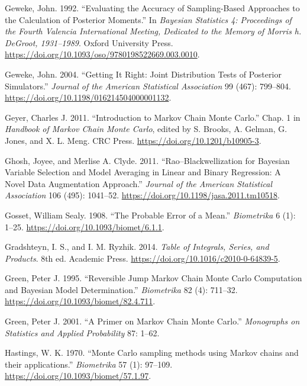 \documentclass[
  11pt,
  letterpaper,
]{scrbook}
\newlength{\cslhangindent}
\newenvironment{CSLReferences}[2] %
 {\begin{list}{}{%
  \setlength{\itemindent}{0pt}
  \setlength{\leftmargin}{0pt}
  \setlength{\parsep}{0pt}
  \ifodd #1
   \setlength{\leftmargin}{\cslhangindent}
   \setlength{\itemindent}{-1\cslhangindent}
  \fi
  \setlength{\itemsep}{#2\baselineskip}}}
 {\end{list}}
\theoremstyle{definition}
\theoremstyle{plain}
\theoremstyle{plain}
\theoremstyle{plain}
\theoremstyle{definition}
\theoremstyle{definition}
\theoremstyle{plain}
\theoremstyle{plain}
\theoremstyle{remark}
\begin{document}
\begin{CSLReferences}{1}{1}
Geweke, John. 1992. {``Evaluating the Accuracy of Sampling-Based
Approaches to the Calculation of Posterior Moments.''} In \emph{Bayesian
Statistics 4: Proceedings of the Fourth Valencia International Meeting,
Dedicated to the Memory of Morris h. DeGroot, 1931--1989}. Oxford
University Press.
\url{https://doi.org/10.1093/oso/9780198522669.003.0010}.

Geweke, John. 2004. {``Getting It Right: Joint Distribution Tests of
Posterior Simulators.''} \emph{Journal of the American Statistical
Association} 99 (467): 799--804.
\url{https://doi.org/10.1198/016214504000001132}.

Geyer, Charles J. 2011. {``Introduction to {M}arkov Chain {M}onte
{C}arlo.''} Chap. 1 in \emph{Handbook of {M}arkov Chain {M}onte
{C}arlo}, edited by S. Brooks, A. Gelman, G. Jones, and X. L. Meng. CRC
Press. \url{https://doi.org/10.1201/b10905-3}.

Ghosh, Joyee, and Merlise A. Clyde. 2011. {``{R}ao--{B}lackwellization
for {B}ayesian Variable Selection and Model Averaging in Linear and
Binary Regression: A Novel Data Augmentation Approach.''} \emph{Journal
of the American Statistical Association} 106 (495): 1041--52.
\url{https://doi.org/10.1198/jasa.2011.tm10518}.

Gosset, William Sealy. 1908. {``The Probable Error of a Mean.''}
\emph{Biometrika} 6 (1): 1--25.
\url{https://doi.org/10.1093/biomet/6.1.1}.

Gradshteyn, I. S., and I. M. Ryzhik. 2014. \emph{Table of Integrals,
Series, and Products}. 8th ed. Academic Press.
\url{https://doi.org/10.1016/c2010-0-64839-5}.

Green, Peter J. 1995. {``Reversible Jump {M}arkov Chain {M}onte {C}arlo
Computation and {B}ayesian Model Determination.''} \emph{Biometrika} 82
(4): 711--32. \url{https://doi.org/10.1093/biomet/82.4.711}.

Green, Peter J. 2001. {``A Primer on {M}arkov Chain {M}onte {C}arlo.''}
\emph{Monographs on Statistics and Applied Probability} 87: 1--62.

Hastings, W. K. 1970. {``{Monte {C}arlo sampling methods using {M}arkov
chains and their applications}.''} \emph{Biometrika} 57 (1): 97--109.
\url{https://doi.org/10.1093/biomet/57.1.97}.


\end{CSLReferences}
\end{document}
